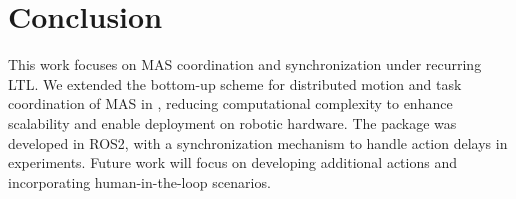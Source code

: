 
\section{Conclusion}
\label{sec:conclusion}
This work focuses on MAS coordination and synchronization under recurring LTL. We extended the bottom-up scheme for distributed motion and task coordination of MAS in \cite{meng_paper}, reducing computational complexity to enhance scalability and enable deployment on robotic hardware. The package was developed in ROS2, with a synchronization mechanism to handle action delays in experiments. Future work will focus on developing additional actions and incorporating human-in-the-loop scenarios.
